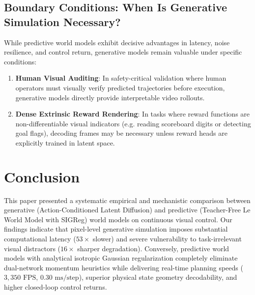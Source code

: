 \documentclass{article}
\begin{document}
\subsection{Boundary Conditions: When Is Generative Simulation Necessary?}
While predictive world models exhibit decisive advantages in latency, noise resilience, and control return, generative models remain valuable under specific conditions:
\begin{enumerate}
    \item \textbf{Human Visual Auditing}: In safety-critical validation where human operators must visually verify predicted trajectories before execution, generative models directly provide interpretable video rollouts.
    \item \textbf{Dense Extrinsic Reward Rendering}: In tasks where reward functions are non-differentiable visual indicators (e.g. reading scoreboard digits or detecting goal flags), decoding frames may be necessary unless reward heads are explicitly trained in latent space.
\end{enumerate}

\section{Conclusion}
This paper presented a systematic empirical and mechanistic comparison between generative (Action-Conditioned Latent Diffusion) and predictive (Teacher-Free Le World Model with SIGReg) world models on continuous visual control. Our findings indicate that pixel-level generative simulation imposes substantial computational latency ($53\times$ slower) and severe vulnerability to task-irrelevant visual distractors ($16\times$ sharper degradation). Conversely, predictive world models with analytical isotropic Gaussian regularization completely eliminate dual-network momentum heuristics while delivering real-time planning speeds ($3,350\text{ FPS}$, $0.30\text{ ms/step}$), superior physical state geometry decodability, and higher closed-loop control returns.
\end{document}
